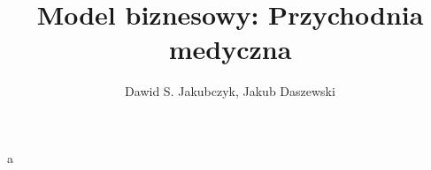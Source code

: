 \documentclass{article}
\author{Dawid S. Jakubczyk, Jakub Daszewski}
\title{Model biznesowy: Przychodnia medyczna}
\begin{document}
	a
\end{document}
